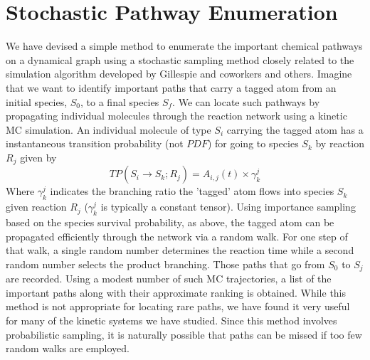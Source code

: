 \section{Stochastic Pathway Enumeration}
\label{ch2:sec:Stochastic_pathway_enumeration}
We have devised a simple method to enumerate the important chemical pathways on a
dynamical graph using a stochastic sampling method closely related to the simulation
algorithm developed by Gillespie and coworkers\cite{ch1_IRPC_36_gillespie2013perspective} and others\cite{ch1_IRPC_46_tosatto2013simplifying}. Imagine that we
want to identify important paths that carry a tagged atom from an initial species, $S_0$, to
a final species $S_f$. We can locate such pathways by propagating individual molecules
through the reaction network using a kinetic MC simulation. An individual molecule of
type $S_i$ carrying the tagged atom has a instantaneous transition probability (not $PDF$) for going to species
$S_k$ by reaction $R_j$ given by
\begin{equation}
\label{ch2:eqn23}
TP\left(  S_i \xrightarrow[]{} S_k; R_j \right) = A_{i,j}(t) \times \gamma_k^j
\end{equation}
Where $\gamma_k^j$ indicates the branching ratio the 'tagged' atom flows into species $S_k$ given reaction $R_j$ ($\gamma_k^j$ is typically a constant tensor). Using importance sampling based on the species survival probability, as above, the
tagged atom can be propagated efficiently through the network via a random walk. For
one step of that walk, a single random number determines the reaction time while a
second random number selects the product branching. Those paths that go from $S_0$ to
$S_j$ are recorded. Using a modest number of such MC trajectories, a list of the important
paths along with their approximate ranking is obtained. While this method is not appropriate
for locating rare paths, we have found it very useful for many of the kinetic systems
we have studied. Since this method involves probabilistic sampling, it is naturally
possible that paths can be missed if too few random walks are employed.